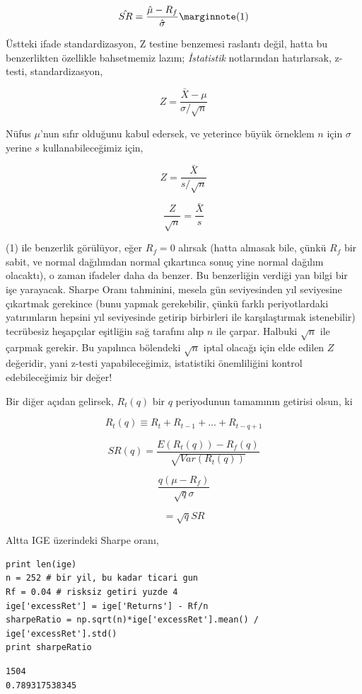 \documentclass[12pt,fleqn]{article}\usepackage{../../common}
\begin{document}
$$ 
\hat{SR} = \frac{\hat{\mu} - R_f}{\hat{\sigma}} 
\mlabel{1} 
$$

Üstteki ifade standardizasyon, Z testine benzemesi raslantı değil, hatta bu
benzerlikten özellikle bahsetmemiz lazım; {\em İstatistik} notlarından
hatırlarsak, z-testi, standardizasyon,

$$ Z = \frac{\bar{X} - \mu}{\sigma / \sqrt{n} } $$

Nüfus $\mu$'nun sıfır olduğunu kabul edersek, ve yeterince büyük örneklem
$n$ için $\sigma$ yerine $s$ kullanabileceğimiz için,

$$ Z = \frac{\bar{X}}{s / \sqrt{n} } $$

$$ \frac{Z}{\sqrt{n}} = \frac{\bar{X}}{s} $$

(1) ile benzerlik görülüyor, eğer $R_f=0$ alırsak (hatta almasak bile,
çünkü $R_f$ bir sabit, ve normal dağılımdan normal çıkartınca sonuç yine
normal dağılım olacaktı), o zaman ifadeler daha da benzer. Bu benzerliğin
verdiği yan bilgi bir işe yarayacak. Sharpe Oranı tahminini, mesela gün
seviyesinden yıl seviyesine çıkartmak gerekince (bunu yapmak gerekebilir,
çünkü farklı periyotlardaki yatırımların hepsini yıl seviyesinde getirip
birbirleri ile karşılaştırmak istenebilir) tecrübesiz heşapçılar eşitliğin
sağ tarafını alıp $n$ ile çarpar. Halbuki $\sqrt{n}$ ile çarpmak
gerekir. Bu yapılınca bölendeki $\sqrt{n}$ iptal olacağı için elde edilen
$Z$ değeridir, yani z-testi yapabileceğimiz, istatistiki önemliliğini
kontrol edebileceğimiz bir değer!

Bir diğer açıdan gelirsek,  $R_t(q)$ bir $q$ periyodunun tamamının getirisi
olsun, ki

$$ R_t(q) \equiv R_t + R_{t-1} + ... + R_{t-q+1}  $$

$$ SR(q) = \frac{E(R_t(q)) - R_f(q)}{\sqrt{Var(R_t(q))}} $$

$$ \frac{q(\mu-R_f)}{\sqrt{q} \sigma} $$

$$ = \sqrt{q}SR $$

Altta IGE üzerindeki Sharpe oranı,

\begin{verbatim}
print len(ige)
n = 252 # bir yil, bu kadar ticari gun
Rf = 0.04 # risksiz getiri yuzde 4
ige['excessRet'] = ige['Returns'] - Rf/n
sharpeRatio = np.sqrt(n)*ige['excessRet'].mean() / ige['excessRet'].std()
print sharpeRatio
\end{verbatim}

\begin{verbatim}
1504
0.789317538345
\end{verbatim}
\end{document}
